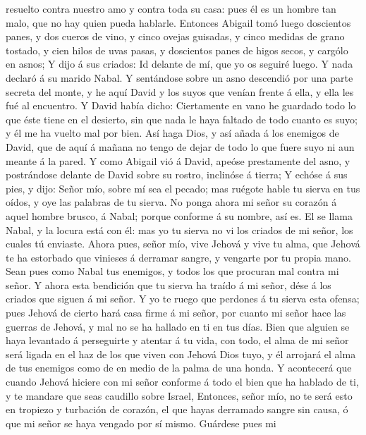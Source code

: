 resuelto contra nuestro amo y contra toda su casa: pues él es un hombre
tan malo, que no hay quien pueda hablarle.  Entonces
Abigail tomó luego doscientos panes, y dos cueros de vino, y cinco
ovejas guisadas, y cinco medidas de grano tostado, y cien hilos de uvas
pasas, y doscientos panes de higos secos, y cargólo en asnos;
 Y dijo á sus criados: Id delante de mí, que yo os seguiré
luego. Y nada declaró á su marido Nabal.  Y sentándose
sobre un asno descendió por una parte secreta del monte, y he aquí David
y los suyos que venían frente á ella, y ella les fué al encuentro.
 Y David había dicho: Ciertamente en vano he guardado todo
lo que éste tiene en el desierto, sin que nada le haya faltado de todo
cuanto es suyo; y él me ha vuelto mal por bien.  Así haga
Dios, y así añada á los enemigos de David, que de aquí á mañana no tengo
de dejar de todo lo que fuere suyo ni aun meante á la pared.
 Y como Abigail vió á David, apeóse prestamente del asno, y
postrándose delante de David sobre su rostro, inclinóse á tierra;
 Y echóse á sus pies, y dijo: Señor mío, sobre mí sea el
pecado; mas ruégote hable tu sierva en tus oídos, y oye las palabras de
tu sierva.  No ponga ahora mi señor su corazón á aquel
hombre brusco, á Nabal; porque conforme á su nombre, así es. El se llama
Nabal, y la locura está con él: mas yo tu sierva no vi los criados de mi
señor, los cuales tú enviaste.  Ahora pues, señor mío, vive
Jehová y vive tu alma, que Jehová te ha estorbado que vinieses á
derramar sangre, y vengarte por tu propia mano. Sean pues como Nabal tus
enemigos, y todos los que procuran mal contra mi señor.  Y
ahora esta bendición que tu sierva ha traído á mi señor, dése á los
criados que siguen á mi señor.  Y yo te ruego que perdones
á tu sierva esta ofensa; pues Jehová de cierto hará casa firme á mi
señor, por cuanto mi señor hace las guerras de Jehová, y mal no se ha
hallado en ti en tus días.  Bien que alguien se haya
levantado á perseguirte y atentar á tu vida, con todo, el alma de mi
señor será ligada en el haz de los que viven con Jehová Dios tuyo, y él
arrojará el alma de tus enemigos como de en medio de la palma de una
honda.  Y acontecerá que cuando Jehová hiciere con mi señor
conforme á todo el bien que ha hablado de ti, y te mandare que seas
caudillo sobre Israel,  Entonces, señor mío, no te será
esto en tropiezo y turbación de corazón, el que hayas derramado sangre
sin causa, ó que mi señor se haya vengado por sí mismo. Guárdese pues mi
